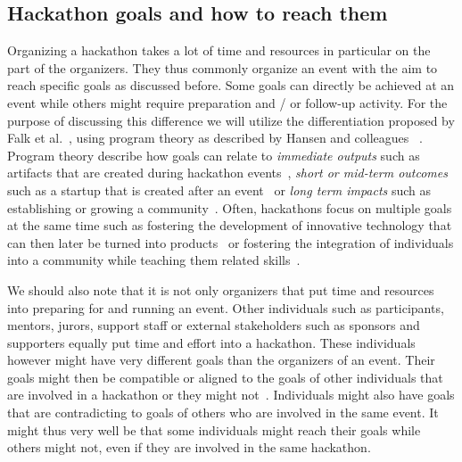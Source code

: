 \documentclass{ieeeaccess}
\begin{document}
\subsection{Hackathon goals and how to reach them}
Organizing a hackathon takes a lot of time and resources in particular on the part of the organizers. 
They thus commonly organize an event with the aim to reach specific goals as discussed before. 
Some goals can directly be achieved at an event while others might require preparation and / or follow-up activity. 
For the purpose of discussing this difference we will utilize the differentiation proposed by Falk et al.~\cite{falk2021hackathons}, using program theory as described by Hansen and colleagues ~\cite{hansen2019participatory}. 
Program theory describe how goals can relate to \textit{immediate outputs} such as artifacts that are created during hackathon events~\cite{pe2019understanding}, \textit{short or mid-term outcomes} such as a startup that is created after an event~\cite{cobham2017appfest} or \textit{long term impacts} such as establishing or growing a community~\cite{disalvo2014building}. 
Often, hackathons focus on multiple goals at the same time such as fostering the development of innovative technology that can then later be turned into products~\cite{leemet2021utilizing,nolte2018you} or fostering the integration of individuals into a community while teaching them related skills~\cite{nolte2020support,cameron2016brainhack}.

We should also note that it is not only organizers that put time and resources into preparing for and running an event. 
Other individuals such as participants, mentors, jurors, support staff or external stakeholders such as sponsors and supporters equally put time and effort into a hackathon. 
These individuals however might have very different goals than the organizers of an event. 
Their goals might then be compatible or aligned to the goals of other individuals that are involved in a hackathon or they might not~\cite{medina2019does}. 
Individuals might also have goals that are contradicting to goals of others who are involved in the same event. 
It might thus very well be that some individuals might reach their goals while others might not, even if they are involved in the same hackathon.
\end{document}
